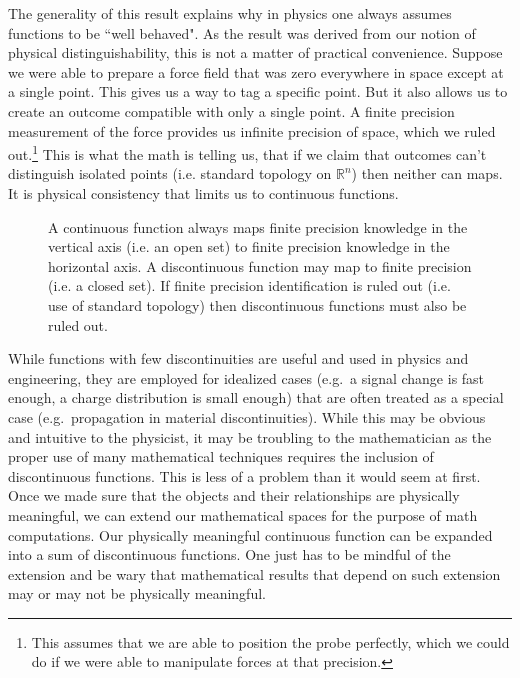 \documentclass[smallextended]{svjour3}
\numberwithin{equation}{section}
\begin{document}
The generality of this result explains why in physics one always assumes functions to be ``well behaved". As the result was derived from our notion of physical distinguishability, this is not a matter of practical convenience. Suppose we were able to prepare a force field that was zero everywhere in space except at a single point. This gives us a way to tag a specific point. But it also allows us to create an outcome compatible with only a single point. A finite precision measurement of the force provides us infinite precision of space, which we ruled out.\footnote{This assumes that we are able to position the probe perfectly, which we could do if we were able to manipulate forces at that precision.} This is what the math is telling us, that if we claim that outcomes can't distinguish isolated points (i.e. standard topology on $\mathbb{R}^n$) then neither can maps. It is physical consistency that limits us to continuous functions.

\begin{figure}
	
	\caption{A continuous function always maps finite precision knowledge in the vertical axis (i.e. an open set) to finite precision knowledge in the horizontal axis. A discontinuous function may map to finite precision (i.e. a closed set). If finite precision identification is ruled out (i.e. use of standard topology) then discontinuous functions must also be ruled out.}
	\label{fig:continuity}
\end{figure}

While functions with few discontinuities are useful and used in physics and engineering, they are employed for idealized cases  (e.g.~a signal change is fast enough, a charge distribution is small enough) that are often treated as a special case (e.g.~propagation in material discontinuities). While this may be obvious and intuitive to the physicist, it may be troubling to the mathematician as the proper use of many mathematical techniques requires the inclusion of discontinuous functions. This is less of a problem than it would seem at first. Once we made sure that the objects and their relationships are physically meaningful, we can extend our mathematical spaces for the purpose of math computations. Our physically meaningful continuous function can be expanded into a sum of discontinuous functions. One just has to be mindful of the extension and be wary that mathematical results that depend on such extension may or may not be physically meaningful.
\end{document}

